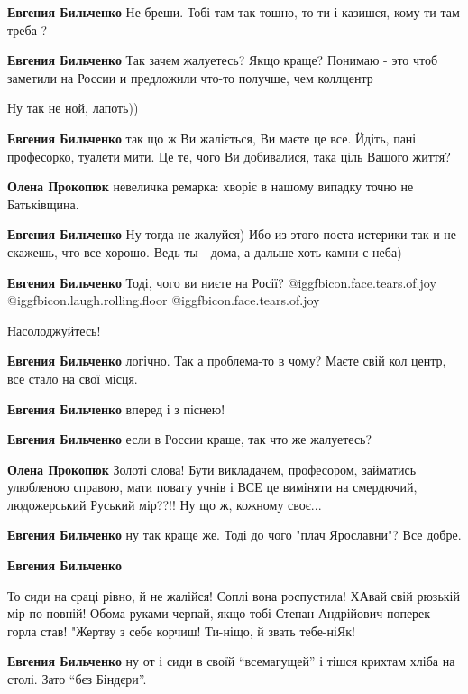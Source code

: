 \begin{itemize}
\begin{itemize}
\textbf{Евгения Бильченко} Не бреши. Тобі там так тошно, то ти і казишся, кому ти там треба ?

\textbf{Евгения Бильченко}
Так зачем жалуетесь? Якщо краще? Понимаю - это чтоб заметили на России и предложили что-то получше, чем коллцентр

Ну так не ной, лапоть))

\textbf{Евгения Бильченко} так що ж Ви жаліється, Ви маєте це все. Йдіть, пані професорко, туалети мити. Це те, чого Ви добивалися, така ціль Вашого життя?

\textbf{Олена Прокопюк} невеличка ремарка: хворіє в нашому випадку точно не Батьківщина.

\textbf{Евгения Бильченко} Ну тогда не жалуйся) Ибо из этого поста-истерики так и не скажешь, что все хорошо. Ведь ты - дома, а дальше хоть камни с неба)

\textbf{Евгения Бильченко} Тоді, чого ви ниєте на Росії?  @igg{fbicon.face.tears.of.joy}  @igg{fbicon.laugh.rolling.floor}  @igg{fbicon.face.tears.of.joy} 

Насолоджуйтесь!

\textbf{Евгения Бильченко} логічно. Так а проблема-то в чому? Маєте свій кол центр, все стало на свої місця.

\textbf{Евгения Бильченко} вперед і з піснею!

\textbf{Евгения Бильченко} если в России краще, так что же жалуетесь?

\textbf{Олена Прокопюк} Золоті слова! Бути викладачем, професором, займатись улюбленою справою, мати повагу учнів і ВСЕ це виміняти на смердючий, людожерський Руський мір??!! Ну що ж, кожному своє...

\textbf{Евгения Бильченко} ну так краще же.
Тоді до чого "плач Ярославни"?
Все добре.

\textbf{Евгения Бильченко} 

То сиди на сраці рівно, й не жалійся! Соплі вона роспустила! ХАвай свій рюзькій
мір по повній! Обома руками черпай, якщо тобі Степан Андрійович поперек горла
став! "Жертву з себе корчиш! Ти-ніщо, й звать тебе-ніЯк!

\textbf{Евгения Бильченко} ну от і сиди в своїй \enquote{всемагущей} і тішся крихтам хліба на столі. Зато \enquote{бєз Біндєри}.


\end{itemize}
\end{itemize}
